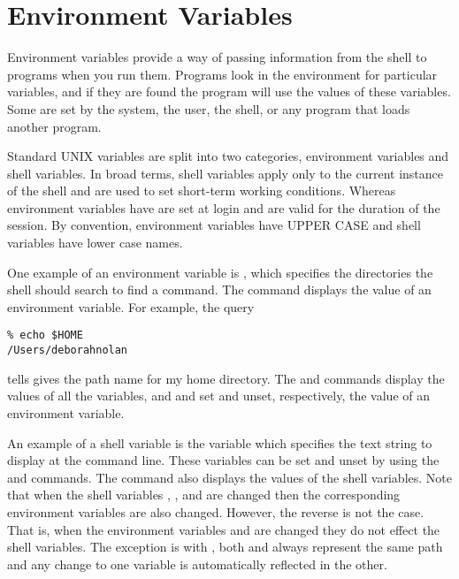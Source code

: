 \section{Environment Variables}
Environment variables provide a way of passing information from the
shell to programs when you run them. Programs look in the environment
for particular variables, and if they are found the program will use
the values of these variables. Some are set by the system, the user,
the shell, or any program that loads another program.

Standard UNIX variables are split into two categories, environment
variables and shell variables. In broad terms, shell variables apply
only to the current instance of the shell and are used to set
short-term working conditions.  Whereas environment variables have are
set at login and are valid for the duration of the session. By
convention, environment variables have UPPER CASE and shell variables
have lower case names.

One example of an environment variable is , which specifies the
directories the shell should search to find a command. The
 command displays the value of an environment
variable. For example, the query
\begin{verbatim}
% echo $HOME
/Users/deborahnolan
\end{verbatim}
tells gives the path name for my home directory.
The  and  commands display the values of
all the variables, and  and  set
and unset, respectively, the value of an environment variable.  

An example of a shell variable is the  variable which specifies
the text string to display at the command line.  These variables can
be set and unset by using the  and 
commands. The  command also displays the values of the
shell variables.  Note that when the shell variables ,
, and  are changed then the
corresponding environment variables are also changed.  However, the
reverse is not the case.  That is, when the environment variables
 and  are changed they do not effect the
shell variables.  The exception is with , both
 and  always represent the same path and
any change to one variable is automatically reflected in the other.

